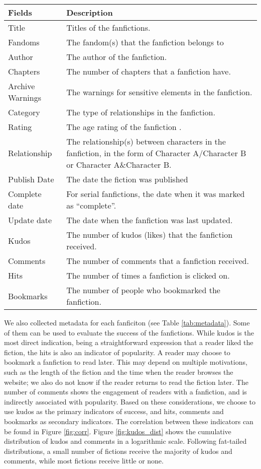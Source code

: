 \documentclass[letterpaper]{article} %
\begin{document}
\begin{table*}
\centering
\begin{tabular}[width=0.8\textwidth]{p{3cm}p{10cm}}
\toprule
Fields & Description \\ 
   \hline			
Title & Titles of the fanfictions.  \\
Fandoms & The fandom(s) that the fanfiction belongs to \\
Author & The author of the fanfiction.  \\
Chapters & The number of chapters that a fanfiction have. \\
Archive Warnings & The warnings for sensitive elements in the fanfiction. \\
Category & The type of relationships in the fanfiction. \\
Rating & The age rating of the fanfiction . \\
Relationship & The relationship(s) between characters in the fanfiction, in the form of Character A/Character B
or Character A\&Character B. \\
Publish Date & The date the fiction was published \\
Complete date & For serial fanfictions, the date when it was marked as ``complete''.\\
Update date & The date when the fanfiction was last updated. \\
\hline
Kudos & The number of kudos (likes) that the fanfiction received. \\
Comments & The number of comments that a fanfiction received.\\
Hits & The number of times a fanfiction is clicked on. \\
Bookmarks & The number of people who bookmarked the fanfiction.\\

\bottomrule
\end{tabular}
\caption{Metadata fields of the fanfictions.}
\label{tab:metadata}
\end{table*}%

We also collected metadata for each fanficiton (see Table \ref{tab:metadata}). Some of them can be used to evaluate the success of the fanfictions. While kudos is the most direct indication, being a straightforward expression that a reader liked the fiction, the hits is also an indicator of popularity. A reader may choose to bookmark a fanfiction to read later. This may depend on multiple motivations, such as the length of the fiction and the time when the reader browses the website; we also do not know if the reader returns to read the fiction later. The number of comments shows the engagement of readers with a fanfiction, and is indirectly associated with popularity. Based on these considerations, we choose to use kudos as the primary indicators of success, and hits, comments and bookmarks as secondary indicators. The correlation between these indicators can be found in Figure \ref{fig:corr}. Figure \ref{fig:kudos_dist} shows the cumulative distribution of kudos and comments in a logarithmic scale. Following fat-tailed distributions, a small number of fictions receive the majority of kudos and comments, while most fictions receive little or none. 
\end{document}
